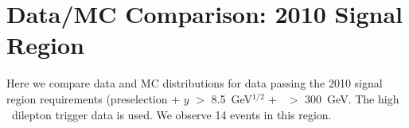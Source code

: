 \section{Data/MC Comparison: 2010 Signal Region}
\label{sec:appendix_datamc_sig}
Here we compare data and MC distributions for data passing the 
2010 signal region requirements (preselection + $y$ $>$ 8.5~GeV$^{1/2}$
+ \Ht\ $>$ 300~GeV. The high \pt\ dilepton trigger
data is used. We observe 14 events in this region.

\clearpage

